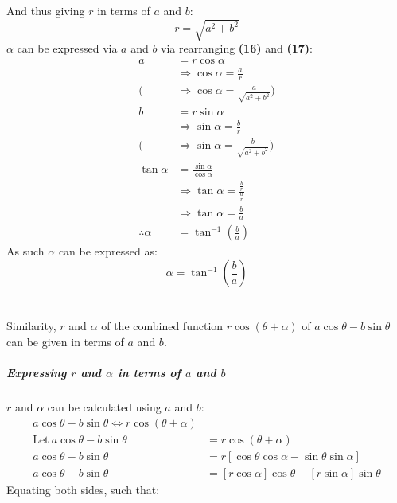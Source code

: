 \documentclass{article}
\begin{document}
        And thus giving $r$ in terms of $a$ and $b$:
        \begin{equation}
            r = \sqrt{a^2 + b^2}
        \end{equation}
        $\alpha$ can be expressed via $a$ and $b$ via rearranging \textbf{(16)} and \textbf{(17)}:
        \begin{align*}
            a &= r\cos\alpha \\
            &\Rightarrow \cos\alpha = \frac{a}{r} \\
            (&\Rightarrow \cos\alpha = \frac{a}{\sqrt{a^2 + b^2}}) \\
            b &= r\sin\alpha \\
            &\Rightarrow \sin\alpha = \frac{b}{r} \\
            (&\Rightarrow \sin\alpha = \frac{b}{\sqrt{a^2 + b^2}}) \\
            \tan\alpha &= \frac{\sin\alpha}{\cos\alpha} \\
            &\Rightarrow \tan\alpha = \frac{\frac{b}{r}}{\frac{a}{r}} \\
            &\Rightarrow \tan\alpha = \frac{b}{a} \\
            \therefore \alpha &= \tan^{-1}{\left( \frac{b}{a}\right) }
        \end{align*}
        As such $\alpha$ can be expressed as:
        \begin{equation}
            \alpha = \tan^{-1}{\left( \frac{b}{a}\right) }
        \end{equation} \\\\
        Similarity, $r$ and $\alpha$ of the combined function $r\cos{(\theta + \alpha)}$ of $a\cos{\theta} - b\sin{\theta}$ can be given in terms of $a$ and $b$.
        \subparagraph{Expressing $r$ and $\alpha$ in terms of $a$ and $b$} $r$ and $\alpha$ can be calculated using $a$ and $b$:
        \begin{align*}
        a\cos{\theta} - b\sin{\theta} \Leftrightarrow r\cos{(\theta + \alpha)} \\
        \mathrm{Let \ } a\cos{\theta} - b\sin{\theta} &= r\cos{(\theta + \alpha)} \\
        a\cos{\theta} - b\sin{\theta} &= r[\cos\theta\cos\alpha - \sin\theta\sin\alpha] \\
        a\cos{\theta} - b\sin{\theta} &= [r\cos\alpha]\cos{\theta} - [r\sin\alpha]\sin{\theta}
        \end{align*}
        Equating both sides, such that:
\end{document}
